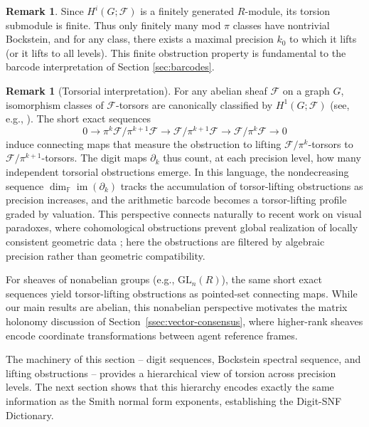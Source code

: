 \documentclass[11pt]{amsart}
\theoremstyle{plain}
\theoremstyle{definition}
\newtheorem{remark}[theorem]{Remark}
\newcommand{\Ring}{R}                          %
\newcommand{\unif}{\pi}                        %
\newcommand{\sheaf}[1]{\mathcal{#1}}                  %
\newcommand{\Digit}[1]{\partial_{#1}}%
\DeclareMathOperator{\im}{im}                         %
\begin{document}
\begin{remark}
Since $H^i(G;\sheaf{F})$ is a finitely generated $\Ring$-module, its torsion 
submodule is finite. Thus only finitely many mod $\unif$ classes have nontrivial 
Bockstein, and for any class, there exists a maximal precision $k_0$ to which it 
lifts (or it lifts to all levels). This finite obstruction property is fundamental 
to the barcode interpretation of Section \ref{sec:barcodes}.
\end{remark}

\begin{remark}[Torsorial interpretation]
\label{rem:torsor-viewpoint}
For any abelian sheaf $\sheaf{F}$ on a graph $G$, isomorphism classes of 
$\sheaf{F}$-torsors are canonically classified by $H^1(G;\sheaf{F})$ (see, e.g., 
\cite{Stacks_Torsors_H1}). The short exact sequences
\[
0 \to \unif^k\sheaf{F}/\unif^{k+1}\sheaf{F} \to \sheaf{F}/\unif^{k+1}\sheaf{F} 
\to \sheaf{F}/\unif^k\sheaf{F} \to 0
\]
induce connecting maps that measure the obstruction to lifting 
$\sheaf{F}/\unif^k$-torsors to $\sheaf{F}/\unif^{k+1}$-torsors. The digit maps 
$\Digit{k}$ thus count, at each precision level, how many independent torsorial 
obstructions emerge. In this language, the nondecreasing sequence 
$\dim_{\mathbb{F}} \im(\Digit{k})$ tracks the accumulation of torsor-lifting 
obstructions as precision increases, and the arithmetic barcode becomes a 
torsor-lifting profile graded by valuation. This perspective connects naturally 
to recent work on visual paradoxes, where cohomological obstructions prevent 
global realization of locally consistent geometric data \cite{GhristCooperband_2025_ObstructionsToReality}; 
here the obstructions are filtered by algebraic precision rather than geometric compatibility.

For sheaves of nonabelian groups (e.g., $\mathrm{GL}_n(\Ring)$), the same short 
exact sequences yield torsor-lifting obstructions as pointed-set connecting maps. 
While our main results are abelian, this nonabelian perspective motivates the 
matrix holonomy discussion of Section~\ref{ssec:vector-consensus}, where 
higher-rank sheaves encode coordinate transformations between agent reference 
frames.
\end{remark}

The machinery of this section -- digit sequences, Bockstein spectral sequence, 
and lifting obstructions -- provides a hierarchical view of torsion across precision 
levels. The next section shows that this hierarchy encodes exactly the same 
information as the Smith normal form exponents, establishing the Digit-SNF Dictionary.
\end{document}
